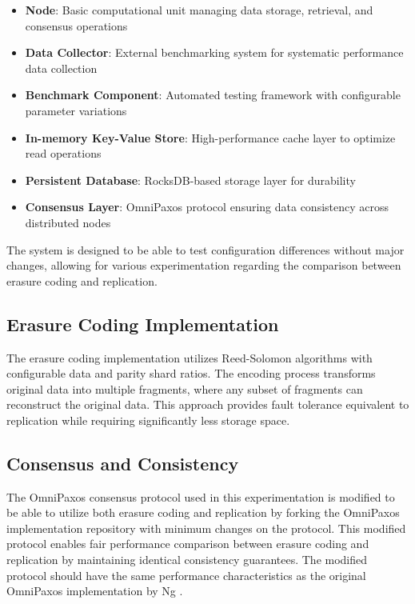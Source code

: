 \begin{itemize}
\item \textbf{Node}: Basic computational unit managing data storage, retrieval, and consensus operations
\item \textbf{Data Collector}: External benchmarking system for systematic performance data collection
\item \textbf{Benchmark Component}: Automated testing framework with configurable parameter variations
\item \textbf{In-memory Key-Value Store}: High-performance cache layer to optimize read operations
\item \textbf{Persistent Database}: RocksDB-based storage layer for durability
\item \textbf{Consensus Layer}: OmniPaxos protocol ensuring data consistency across distributed nodes
\end{itemize}

The system is designed to be able to test configuration differences without major changes, allowing for various experimentation regarding the comparison between erasure coding and replication.

\subsection{Erasure Coding Implementation}

The erasure coding implementation utilizes Reed-Solomon algorithms with configurable data and parity shard ratios. The encoding process transforms original data into multiple fragments, where any subset of fragments can reconstruct the original data. This approach provides fault tolerance equivalent to replication while requiring significantly less storage space.

\subsection{Consensus and Consistency}

The OmniPaxos consensus protocol used in this experimentation is modified to be able to utilize both erasure coding and replication by forking the OmniPaxos implementation repository with minimum changes on the protocol. This modified protocol enables fair performance comparison between erasure coding and replication by maintaining identical consistency guarantees. The modified protocol should have the same performance characteristics as the original OmniPaxos implementation by Ng \cite{ng2023omni}.

